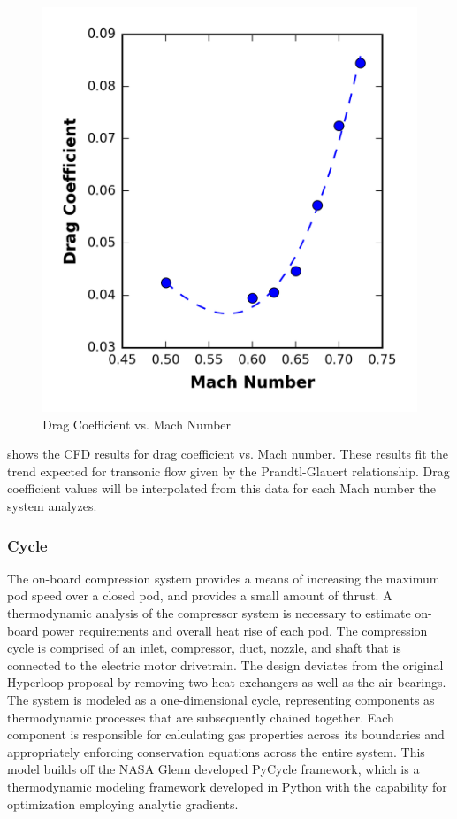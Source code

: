 	\begin{figure}
		\centering
		\includegraphics{../../images/graphs/cd_vs_mach/cd_vs_mach.png}
		\caption{Drag Coefficient vs. Mach Number}
		\label{fig:cd_vs_mach}
	\end{figure}
	 shows the CFD results for drag coefficient vs. Mach number.
	These results fit the trend expected for transonic flow given by the
	Prandtl-Glauert relationship. Drag coefficient values will be interpolated
	from this data for each Mach number the system analyzes.
\subsubsection{Cycle}
	The on-board compression system provides a means of increasing the maximum
	pod speed over a closed pod,  and provides a small amount of thrust.
	A thermodynamic analysis of the compressor system is necessary to estimate
	on-board power requirements and overall heat rise of each pod.
	The compression cycle is comprised of an inlet, compressor, duct, nozzle,
	and shaft that is connected to the electric motor drivetrain. The design
	deviates from the original Hyperloop proposal by removing two heat
	exchangers as well as the air-bearings. The system is modeled as a
	one-dimensional cycle, representing components as thermodynamic processes
	that are subsequently chained together. Each component is responsible for
	calculating gas properties across its boundaries and appropriately enforcing
	conservation equations across the entire system. This model builds off the
	NASA Glenn developed PyCycle framework, which is a thermodynamic modeling
	framework developed in Python with the capability for optimization
	employing analytic gradients. \cite{PyCycle}

